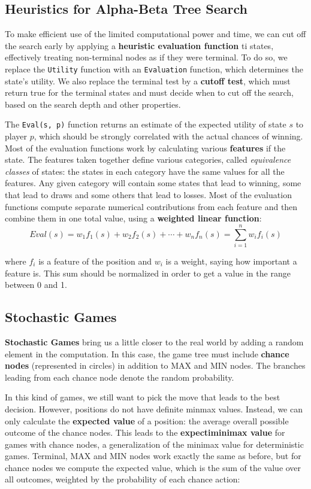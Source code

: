 \documentclass{article}
\begin{document}
\subsection{Heuristics for Alpha-Beta Tree Search}
To make efficient use of the limited computational power and time, we can cut off the search early by applying a \textbf{heuristic evaluation function} ti states, effectively treating non-terminal nodes as if they were terminal. To do so, we replace the \lstinline{Utility} function with an \lstinline{Evaluation} function, which determines the state's utility. We also replace the terminal test by a \textbf{cutoff test}, which must return true for the terminal states and must decide when to cut off the search, based on the search depth and other properties.

The \lstinline{Eval(s, p)} function returns an estimate of the expected utility of state \(s\) to player \(p\), which should be strongly correlated with the actual chances of winning. Most of the evaluation functions work by calculating various \textbf{features} if the state. The features taken together define various categories, called \textit{equivalence classes} of states: the states in each category have the same values for all the features. Any given category will contain some states that lead to winning, some that lead to draws and some others that lead to losses. Most of the evaluation functions compute separate numerical contributions from each feature and then combine them in one total value, using a \textbf{weighted linear function}:
\[Eval(s) = w_1f_1(s)+w_2f_2(s)+\cdots+w_nf_n(s) = \sum_{i=1}^{n}w_if_i(s)\]

\noindent where \(f_i\) is a feature of the position and \(w_i\) is a weight, saying how important a feature is. This sum should be normalized in order to get a value in the range between 0 and 1.

\subsection{Stochastic Games}
\textbf{Stochastic Games} bring us a little closer to the real world by adding a random element in the computation. In this case, the game tree must include \textbf{chance nodes} (represented in circles) in addition to MAX and MIN nodes. The branches leading from each chance node denote the random probability. 

In this kind of games, we still want to pick the move that leads to the best decision. However, positions do not have definite minmax values. Instead, we can only calculate the \textbf{expected value} of a position: the average overall possible outcome of the chance nodes. This leads to the \textbf{expectiminimax value} for games with chance nodes, a generalization of the minimax value for deterministic games. Terminal, MAX and MIN nodes work exactly the same as before, but for chance nodes we compute the expected value, which is the sum of the value over all outcomes, weighted by the probability of each chance action:
\end{document}
